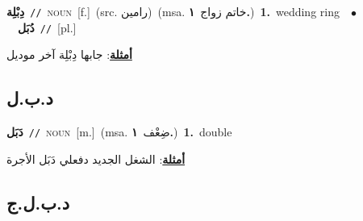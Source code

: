 \documentclass[10pt,a4paper,twoside]{article} %
\begin{document}
\begin{multicols}{2}
{{{{{{\setlength\topsep{0pt}\textbf{\foreignlanguage{arabic}{دِبْلِة}}\ {\color{gray}\texttt{//}\color{black}}\ \textsc{noun}\ [f.]\ (src. \color{gray}\foreignlanguage{arabic}{رامين}\color{black})\ \color{gray}(msa. \foreignlanguage{arabic}{خاتم زواج}~\foreignlanguage{arabic}{\textbf{١.}})\color{black}\ \textbf{1.}~wedding ring\ \ $\bullet$\ \ \setlength\topsep{0pt}\textbf{\foreignlanguage{arabic}{دُبَل}}\ {\color{gray}\texttt{//}\color{black}}\ [pl.]\  \begin{flushright}\color{gray}\foreignlanguage{arabic}{\textbf{\underline{\foreignlanguage{arabic}{أمثلة}}}: جابها دِبْلِة آخر موديل}\end{flushright}\color{black}} \vspace{2mm}

\vspace{-3mm}
\subsection*{\color{blue}\foreignlanguage{arabic}{د.ب.ل}\color{blue}{ (ntws)}} 

{\setlength\topsep{0pt}\textbf{\foreignlanguage{arabic}{دَبَل}}\ {\color{gray}\texttt{//}\color{black}}\ \textsc{noun}\ [m.]\ \color{gray}(msa. \foreignlanguage{arabic}{ضِعْف}~\foreignlanguage{arabic}{\textbf{١.}})\color{black}\ \textbf{1.}~double\  \begin{flushright}\color{gray}\foreignlanguage{arabic}{\textbf{\underline{\foreignlanguage{arabic}{أمثلة}}}: الشغل الجديد دفعلي دَبَل الأجرة}\end{flushright}\color{black}} \vspace{2mm}

\vspace{-3mm}
\subsection*{\color{blue}\foreignlanguage{arabic}{د.ب.ل.ج}\color{blue}{ (ntws)}} 

}}}}}
\end{multicols}
\end{document}
